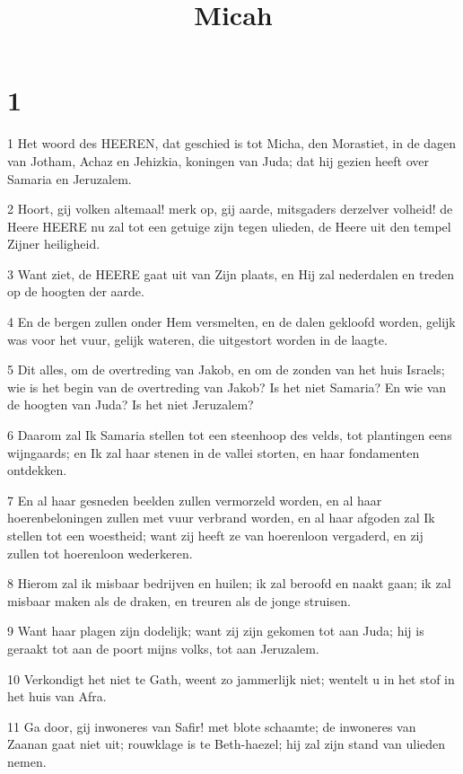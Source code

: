 

\title{Micah}



\chapter{1}

\par 1 Het woord des HEEREN, dat geschied is tot Micha, den Morastiet, in de dagen van Jotham, Achaz en Jehizkia, koningen van Juda; dat hij gezien heeft over Samaria en Jeruzalem.
\par 2 Hoort, gij volken altemaal! merk op, gij aarde, mitsgaders derzelver volheid! de Heere HEERE nu zal tot een getuige zijn tegen ulieden, de Heere uit den tempel Zijner heiligheid.
\par 3 Want ziet, de HEERE gaat uit van Zijn plaats, en Hij zal nederdalen en treden op de hoogten der aarde.
\par 4 En de bergen zullen onder Hem versmelten, en de dalen gekloofd worden, gelijk was voor het vuur, gelijk wateren, die uitgestort worden in de laagte.
\par 5 Dit alles, om de overtreding van Jakob, en om de zonden van het huis Israels; wie is het begin van de overtreding van Jakob? Is het niet Samaria? En wie van de hoogten van Juda? Is het niet Jeruzalem?
\par 6 Daarom zal Ik Samaria stellen tot een steenhoop des velds, tot plantingen eens wijngaards; en Ik zal haar stenen in de vallei storten, en haar fondamenten ontdekken.
\par 7 En al haar gesneden beelden zullen vermorzeld worden, en al haar hoerenbeloningen zullen met vuur verbrand worden, en al haar afgoden zal Ik stellen tot een woestheid; want zij heeft ze van hoerenloon vergaderd, en zij zullen tot hoerenloon wederkeren.
\par 8 Hierom zal ik misbaar bedrijven en huilen; ik zal beroofd en naakt gaan; ik zal misbaar maken als de draken, en treuren als de jonge struisen.
\par 9 Want haar plagen zijn dodelijk; want zij zijn gekomen tot aan Juda; hij is geraakt tot aan de poort mijns volks, tot aan Jeruzalem.
\par 10 Verkondigt het niet te Gath, weent zo jammerlijk niet; wentelt u in het stof in het huis van Afra.
\par 11 Ga door, gij inwoneres van Safir! met blote schaamte; de inwoneres van Zaanan gaat niet uit; rouwklage is te Beth-haezel; hij zal zijn stand van ulieden nemen.
